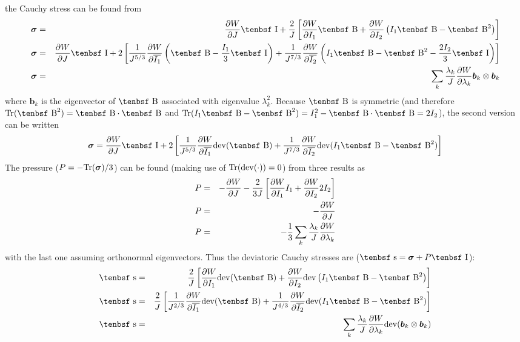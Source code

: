 \documentclass[11pt]{book}
\renewcommand{\vec}[1]{\boldsymbol{#1}}
\newcommand{\tens}[1]{\boldsymbol{\mathsf{#1}}}
\def\B{\hbox{\tenbsf B}}
\def\dev{\hbox{\tenbsf s}}
\def\I{\hbox{\tenbsf I}}
\begin{document}
the Cauchy stress can be found from
\begin{eqnarray}
   \tens\sigma & = & {\partial W\over \partial J}\I + {2\over J}\left[ {\partial W\over \partial I_1}\B
                                             + {\partial W\over \partial I_2}\left(I_1\B- \B^2\right)
                                            \right]      \\
   \tens\sigma & = & {\partial W\over \partial J}\I + 2\left[ {1\over J^{5/3}}
                           {\partial W\over \partial \overline{I_1}}\left(\B -  {I_1\over 3}\I\right)
                           + {1\over J^{7/3}}{\partial W\over \partial \overline{I_2}}\left( I_1 \B- \B^2 - {2I_2\over 3}\I  \right)
                             \right] \\
   \tens\sigma & = & \sum_k {\lambda_k\over J} {\partial W\over\partial \lambda_k} \vec b_k\otimes\vec b_k
\end{eqnarray}
where $\vec b_k$ is the eigenvector of $\B$ associated with eigenvalue $\lambda_k^2$.
Because $\B$ is symmetric (and therefore ${\rm Tr}(\B^2) = \B\cdot\B$ and ${\rm Tr}(I_1\B-\B^2)=I_1^2-\B\cdot\B = 2I_2$), the second version can be written
\begin{equation}
           \tens\sigma = {\partial W\over \partial J}\I + 2\left[ {1\over J^{5/3}}
                                           {\partial W\over \partial \overline{I_1}}{\rm dev}(\B)
                                        + {1\over J^{7/3}}{\partial W\over \partial \overline{I_2}}{\rm dev}( I_1 \B- \B^2)
                                           \right]
\end{equation}
The pressure ($P = -{\rm Tr}(\tens\sigma)/3$) can be found (making use of ${\rm Tr}({\rm dev}(\cdot))=0$) from three results as
\begin{eqnarray}
   P & = & -{\partial W\over \partial J} - {2\over 3J}\left[ {\partial W\over \partial I_1}I_1  + {\partial W\over \partial I_2}2I_2   \right]      \\
   P & = & - {\partial W\over \partial J} \\
   P & = &  -{1\over 3}\sum_k {\lambda_k\over J} {\partial W\over\partial \lambda_k}
\end{eqnarray}
with the last one assuming orthonormal eigenvectors.
Thus the deviatoric Cauchy stresses are ($\dev = \tens\sigma + P\I$):
\begin{eqnarray}
   \dev & = &  {2\over J}\left[ {\partial W\over \partial I_1}{\rm dev}(\B)
                                             + {\partial W\over \partial I_2}{\rm dev}\left(I_1\B- \B^2\right)
                                            \right]      \\
   \dev & = &  {2\over J}\left[ {1\over J^{2/3}}{\partial W\over \partial \overline{I_1}}{\rm dev}(\B)
                                        + {1\over J^{4/3}}{\partial W\over \partial \overline{I_2}}{\rm dev}( I_1 \B- \B^2)
                                           \right] \\
   \dev & = &  \sum_k {\lambda_k\over J} {\partial W\over\partial \lambda_k} {\rm dev}(\vec b_k\otimes\vec b_k)
\end{eqnarray}
\end{document}
